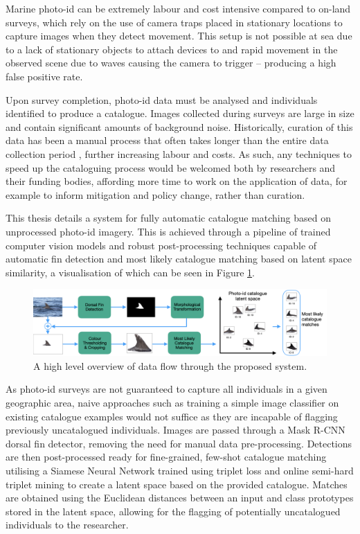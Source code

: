 Marine photo-id can be extremely labour and cost intensive compared to on-land surveys, which rely on the use of camera traps placed in stationary locations to capture images when they detect movement. This setup is not possible at sea due to a lack of stationary objects to attach devices to and rapid movement in the observed scene due to waves causing the camera to trigger -- producing a high false positive rate. 

Upon survey completion, photo-id data must be analysed and individuals identified to produce a catalogue. Images collected during surveys are large in size and contain significant amounts of background noise. Historically, curation of this data has been a manual process that often takes longer than the entire data collection period \cite{tyson_moore_rise_2022}, further increasing labour and costs. As such, any techniques to speed up the cataloguing process would be welcomed both by researchers and their funding bodies, affording more time to work on the application of data, for example to inform mitigation and policy change, rather than curation. 

This thesis details a system for fully automatic catalogue matching based on unprocessed photo-id imagery. This is achieved through a pipeline of trained computer vision models and robust post-processing techniques capable of automatic fin detection and most likely catalogue matching based on latent space similarity, a visualisation of which can be seen in Figure \ref{fig:pipeline}. 

\begin{figure}[b]
	\begin{center}
		\includegraphics[width=\linewidth]{Chapter1/figs/pipeline_compact.png}
	\end{center}
	\caption{A high level overview of data flow through the proposed system.}
	\label{fig:pipeline}
\end{figure}

As photo-id surveys are not guaranteed to capture all individuals in a given geographic area, naive approaches such as training a simple image classifier on existing catalogue examples would not suffice as they are incapable of flagging previously uncatalogued individuals. Images are passed through a Mask R-CNN \cite{he_mask_2017} dorsal fin detector, removing the need for manual data pre-processing. Detections are then post-processed ready for fine-grained, few-shot catalogue matching utilising a Siamese Neural Network trained using triplet loss \cite{schroff_facenet_2015} and online semi-hard triplet mining to create a latent space based on the provided catalogue. Matches are obtained using the Euclidean distances between an input and class prototypes stored in the latent space, allowing for the flagging of potentially uncatalogued individuals to the researcher.

